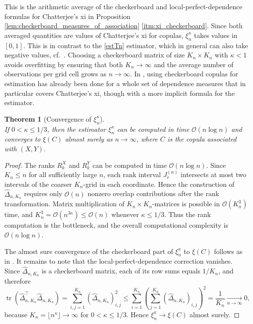 \documentclass{article}
\newtheorem{theorem}[thm]{Theorem}
\theoremstyle{definition}
\newcommand{\OO}{\mathcal{O}}  %
\DeclareMathOperator{\tr}{tr}  %
\begin{document}
This is the arithmetic average of the checkerboard and local-perfect-dependence formulas for Chatterjee's xi in Proposition \ref{lem:checkerboard_measures_of_association} \ref{itm:xi_checkerboard}.
Since both averaged quantities are values of Chatterjee's xi for copulas, \(\xi_n^\kappa\) takes values in \([0,1]\).
This is in contrast to the \eqref{estTn} estimator, which in general can also take negative values, cf.~\cite[Rem.~3]{chatterjee2021}.
Choosing a checkerboard matrix of size \(K_n\times K_n\) with \(\kappa<1\) avoids overfitting by ensuring that both \(K_n\to\infty\) and the average number of observations per grid cell grows as \(n\to\infty\).
In \cite{Ansari-Fuchs-2023}, using checkerboard copulas for estimation has already been done for a whole set of dependence measures that in particular covers Chatterjee's xi, though with a more implicit formula for the estimator.

\begin{theorem}[Convergence of $\xi^{\kappa}_n$]\label{thm:xi_estimator}~\\
    If \(0<\kappa\leq 1/3\), then the estimator $\xi^{\kappa}_n$ can be computed in time $\OO(n\log n)$ and converges to $\xi(C)$ almost surely as $n\to\infty$, where $C$ is the copula associated with $(X,Y)$.
\end{theorem}

\begin{proof}
    The ranks \(R_k^X\) and \(R_k^Y\) can be computed in time \(\OO(n\log n)\).
    Since \(K_n\le n\) for all sufficiently large \(n\), each rank interval \(J_r^{(n)}\) intersects at most two intervals of the coarser \(K_n\)-grid in each coordinate.
    Hence the construction of \(\widehat\Delta_{n,K_n}\) requires only \(\OO(n)\) nonzero overlap contributions after the rank transformation.
    Matrix multiplication of \(K_n\times K_n\)-matrices is possible in \(\OO(K_n^3)\) time, and \(K_n^3=\OO(n^{3\kappa})\le \OO(n)\) whenever \(\kappa\le 1/3\).
    Thus the rank computation is the bottleneck, and the overall computational complexity is \(\OO(n\log n)\).

    The almost sure convergence of the checkerboard part of \(\xi_n^\kappa\) to \(\xi(C)\) follows as in \cite[Theorem 4.2]{Ansari-Fuchs-2023}.
    It remains to note that the local-perfect-dependence correction vanishes.
    Since \(\widehat\Delta_{n,K_n}\) is a checkerboard matrix, each of its row sums equals \(1/K_n\), and therefore
    \[
        \tr\!\left(
            \widehat\Delta_{n,K_n}^\top
            \widehat\Delta_{n,K_n}
        \right)
        =
        \sum_{i,j=1}^{K_n}
        \left(\widehat\Delta_{n,K_n}\right)_{i,j}^2
        \le
        \sum_{i=1}^{K_n}
        \left(
            \sum_{j=1}^{K_n}
            \left(\widehat\Delta_{n,K_n}\right)_{i,j}
        \right)^2
        =
        \frac{1}{K_n}
        \xrightarrow[n\to\infty]{}0,
    \]
    because \(K_n=\lfloor n^\kappa\rfloor\to\infty\) for \(0<\kappa\le 1/3\).
    Hence \(\xi_n^\kappa\to \xi(C)\) almost surely.
\end{proof}
\end{document}
